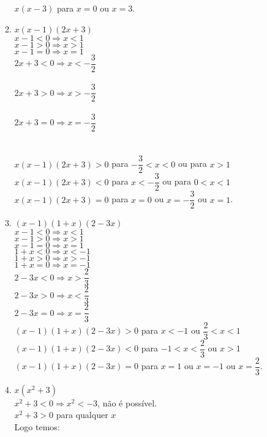 \documentclass[10pt]{book}
\begin{document}
\begin{enumerate}
\begin{enumerate}
		$x(x - 3)$ para $x = 0$ ou $x = 3$.
		\addtocounter{enumii}{1}
		\item
		$x(x - 1)(2x + 3)$\\
		$x - 1 < 0 \Rightarrow x < 1$\\
		$x - 1 > 0 \Rightarrow x > 1$\\
		$x - 1 = 0 \Rightarrow x = 1$\\		
		$2x + 3 < 0 \Rightarrow x < -\dfrac{3}{2}$\\\\
		$2x + 3 > 0 \Rightarrow x > -\dfrac{3}{2}$\\\\
		$2x + 3 = 0 \Rightarrow x = -\dfrac{3}{2}$\\\\
		\\
		$x(x - 1)(2x + 3) > 0$ para $-\dfrac{3}{2} < x < 0$ ou para $x > 1$\\
		$x(x - 1)(2x + 3) < 0$ para $x < -\dfrac{3}{2}$ ou para $0 < x < 1$\\
		$x(x - 1)(2x + 3) = 0$ para $x = 0$ ou $x = -\dfrac{3}{2}$ ou $x = 1$.
		\item
		$(x - 1)(1 + x)(2 - 3x)$\\
		$x - 1 < 0 \Rightarrow x < 1$\\
		$x - 1 > 0 \Rightarrow x > 1$\\
		$x - 1 = 0 \Rightarrow x = 1$\\
		$1 + x < 0 \Rightarrow x < -1$\\
		$1 + x > 0 \Rightarrow x > -1$\\
		$1 + x = 0 \Rightarrow x = -1$\\[6pt]
		$2 - 3x < 0 \Rightarrow x > \dfrac{2}{3}$\\[6pt]
		$2 - 3x > 0 \Rightarrow x < \dfrac{2}{3}$\\[6pt]
		$2 - 3x = 0 \Rightarrow x = \dfrac{2}{3}$\\[6pt]
		$(x - 1)(1 + x)(2 - 3x) > 0$ para $x < -1$ ou $\dfrac{2}{3} < x < 1$\\[6pt]
		$(x - 1)(1 + x)(2 - 3x) < 0$ para $-1 < x < \dfrac{2}{3}$ ou $x > 1$\\[6pt]
		$(x - 1)(1 + x)(2 - 3x) = 0$ para $x = 1$ ou $x = -1$ ou $x = \dfrac{2}{3}$.
		\item
		$x(x^2 + 3)$\\
		$x^2 + 3 < 0 \Rightarrow x^2 < -3$, não é possível.\\
		$x^2 + 3 > 0$ para qualquer $x$\\
		Logo temos: \\

\end{enumerate}
\end{enumerate}
\end{document}
